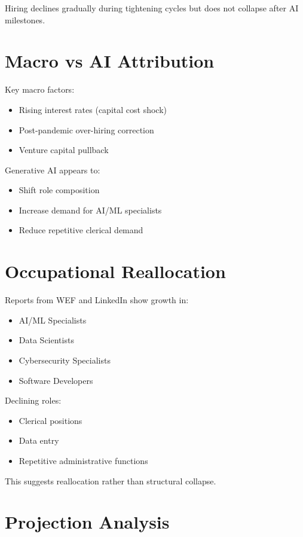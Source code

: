 \documentclass[conference]{IEEEtran}
\begin{document}
Hiring declines gradually during tightening cycles but does not collapse after AI milestones.

\section{Macro vs AI Attribution}

Key macro factors:
\begin{itemize}
\item Rising interest rates (capital cost shock)
\item Post-pandemic over-hiring correction
\item Venture capital pullback
\end{itemize}

Generative AI appears to:
\begin{itemize}
\item Shift role composition
\item Increase demand for AI/ML specialists
\item Reduce repetitive clerical demand
\end{itemize}

\section{Occupational Reallocation}

Reports from WEF and LinkedIn show growth in:

\begin{itemize}
\item AI/ML Specialists
\item Data Scientists
\item Cybersecurity Specialists
\item Software Developers
\end{itemize}

Declining roles:
\begin{itemize}
\item Clerical positions
\item Data entry
\item Repetitive administrative functions
\end{itemize}

This suggests reallocation rather than structural collapse.

\section{Projection Analysis}
\end{document}
